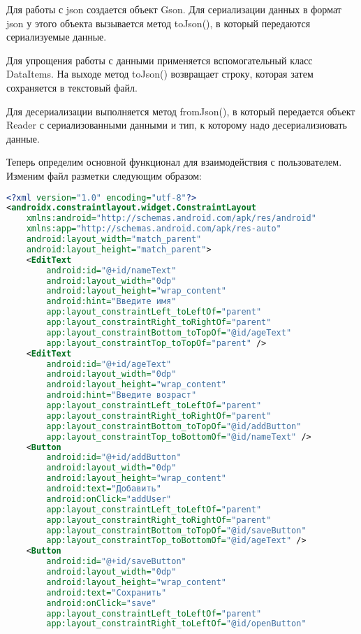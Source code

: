 Для работы с json создается объект Gson. Для сериализации данных в формат
json у этого объекта вызывается метод toJson(), в который передаются
сериализуемые данные.\par
Для упрощения работы с данными применяется вспомогательный класс
DataItems. На выходе метод toJson() возвращает строку, которая затем
сохраняется в текстовый файл.\par
Для десериализации выполняется метод fromJson(), в который передается
объект Reader с сериализованными данными и тип, к которому надо
десериализиовать данные.\par
Теперь определим основной функционал для взаимодействия с
пользователем. Изменим файл разметки следующим образом:

\begin{lstlisting}[language=XML
	, label=lst:
	]
<?xml version="1.0" encoding="utf-8"?>
<androidx.constraintlayout.widget.ConstraintLayout
    xmlns:android="http://schemas.android.com/apk/res/android"
    xmlns:app="http://schemas.android.com/apk/res-auto"
    android:layout_width="match_parent"
    android:layout_height="match_parent">
    <EditText
        android:id="@+id/nameText"
        android:layout_width="0dp"
        android:layout_height="wrap_content"
        android:hint="Введите имя"
        app:layout_constraintLeft_toLeftOf="parent"
        app:layout_constraintRight_toRightOf="parent"
        app:layout_constraintBottom_toTopOf="@id/ageText"
        app:layout_constraintTop_toTopOf="parent" />
    <EditText
        android:id="@+id/ageText"
        android:layout_width="0dp"
        android:layout_height="wrap_content"
        android:hint="Введите возраст"
        app:layout_constraintLeft_toLeftOf="parent"
        app:layout_constraintRight_toRightOf="parent"
        app:layout_constraintBottom_toTopOf="@id/addButton"
        app:layout_constraintTop_toBottomOf="@id/nameText" />
    <Button
        android:id="@+id/addButton"
        android:layout_width="0dp"
        android:layout_height="wrap_content"
        android:text="Добавить"
        android:onClick="addUser"
        app:layout_constraintLeft_toLeftOf="parent"
        app:layout_constraintRight_toRightOf="parent"
        app:layout_constraintBottom_toTopOf="@id/saveButton"
        app:layout_constraintTop_toBottomOf="@id/ageText" />
    <Button
        android:id="@+id/saveButton"
        android:layout_width="0dp"
        android:layout_height="wrap_content"
        android:text="Сохранить"
        android:onClick="save"
        app:layout_constraintLeft_toLeftOf="parent"
        app:layout_constraintRight_toLeftOf="@id/openButton"

\end{lstlisting}
